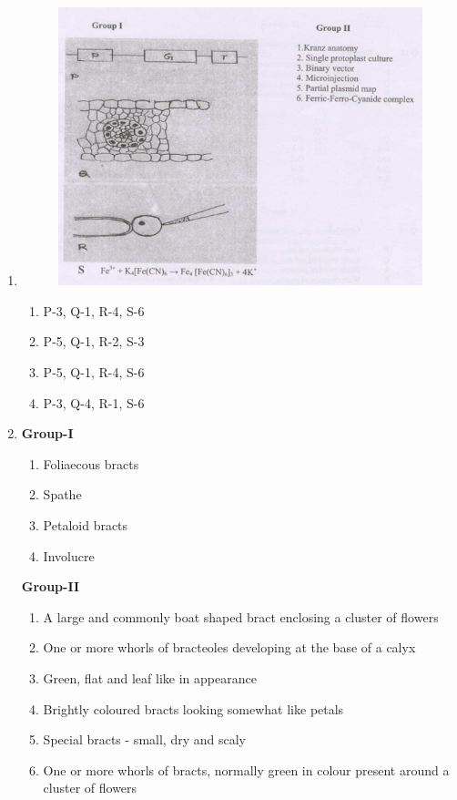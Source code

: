 \documentclass[journal,12pt,onecolumn]{IEEEtran}
\begin{document}
\begin{enumerate}
\item \begin{figure}[h!]
    \centering
    \includegraphics[width=0.9\columnwidth]{FIG/M-16.png}
    \caption*{}
    \label{fig:M-16}
\end{figure}
\begin{multicols}{2}
\begin{enumerate}[label=\Alph*)]
    \item P-3, Q-1, R-4, S-6
    \item P-5, Q-1, R-2, S-3
    \item P-5, Q-1, R-4, S-6
    \item P-3, Q-4, R-1, S-6
\end{enumerate}
\end{multicols}
\item
\begin{multicols}{2}
\textbf{Group-I}
\begin{enumerate}[label=(\Alph*) ,start=16]
    \item Foliaecous bracts
    \item Spathe
    \item Petaloid bracts
    \item Involucre
\end{enumerate}

\columnbreak

\textbf{Group-II}
\begin{enumerate}[label=\arabic*]
    \item A large and commonly boat shaped bract enclosing a cluster of flowers
    \item One or more whorls of bracteoles developing at the base of a calyx
    \item Green, flat and leaf like in appearance
    \item Brightly coloured bracts looking somewhat like petals
    \item Special bracts - small, dry and scaly
    \item One or more whorls of bracts, normally green in colour present around a cluster of flowers
\end{enumerate}
\end{multicols}


\end{enumerate}
\end{document}
